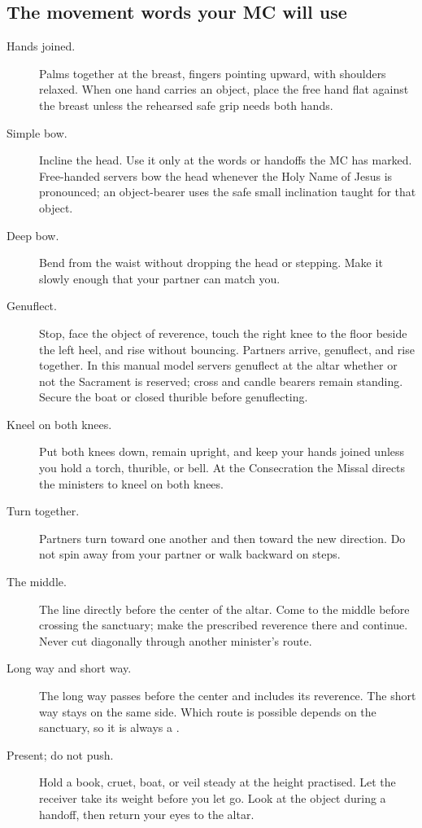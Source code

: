 \subsection{The movement words your MC will use}

\begin{description}
\item[Hands joined.] Palms together at the breast, fingers pointing upward,
with shoulders relaxed.  When one hand carries an object, place the free hand
flat against the breast unless the rehearsed safe grip needs both hands.

\item[Simple bow.] Incline the head.  Use it only at the words or handoffs the
MC has marked. Free-handed servers bow the head whenever the Holy Name of
Jesus is pronounced; an object-bearer uses the safe small inclination taught
for that object.

\item[Deep bow.] Bend from the waist without dropping the head or stepping.
Make it slowly enough that your partner can match you.

\item[Genuflect.] Stop, face the object of reverence, touch the right knee to
the floor beside the left heel, and rise without bouncing.  Partners arrive,
genuflect, and rise together. In this manual model servers genuflect at the
altar whether or not the Sacrament is reserved; cross and candle bearers
remain standing. Secure the boat or closed thurible before genuflecting.

\item[Kneel on both knees.] Put both knees down, remain upright, and keep your
hands joined unless you hold a torch, thurible, or bell.  At the Consecration
the Missal directs the ministers to kneel on both knees.

\item[Turn together.] Partners turn toward one another and then toward the new
direction.  Do not spin away from your partner or walk backward on steps.

\item[The middle.] The line directly before the center of the altar.  Come to
the middle before crossing the sanctuary; make the prescribed reverence there
and continue.  Never cut diagonally through another minister's route.

\item[Long way and short way.] The long way passes before the center and
includes its reverence.  The short way stays on the same side.  Which route is
possible depends on the sanctuary, so it is always a \LocalChoice.

\item[Present; do not push.] Hold a book, cruet, boat, or veil steady at the
height practised.  Let the receiver take its weight before you let go.  Look
at the object during a handoff, then return your eyes to the altar.
\end{description}

